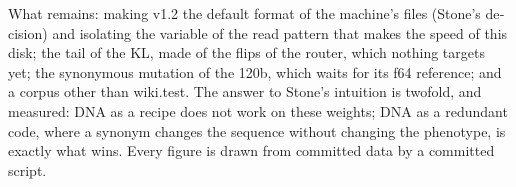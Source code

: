 \begin{otherlanguage}{english}
What remains: making v1.2 the default format of the machine's files (Stone's decision) and isolating the variable of the read pattern that makes the speed of this disk; the tail of the KL, made of the flips of the router, which nothing targets yet; the synonymous mutation of the 120b, which waits for its f64 reference; and a corpus other than wiki.test. The answer to Stone's intuition is twofold, and measured: DNA as a recipe does not work on these weights; DNA as a redundant code, where a synonym changes the sequence without changing the phenotype, is exactly what wins. Every figure is drawn from committed data by a committed script.
\end{otherlanguage}
